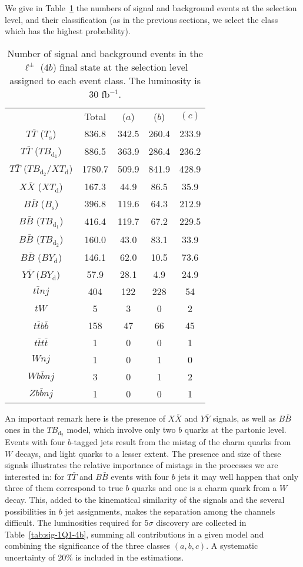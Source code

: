 \documentclass[12pt,a4paper]{article}
\newcommand{\TT}{T \bar T}
\newcommand{\BB}{B \bar B}
\newcommand{\XX}{X \bar X}
\newcommand{\YY}{Y \bar Y}
\newcommand{\Ts}{T_\text{s}}
\newcommand{\Bs}{B_\text{s}}
\newcommand{\TBd}{TB_{\text{d}_1}}
\newcommand{\TBD}{TB_{\text{d}_2}}
\newcommand{\XTd}{XT_\text{d}}
\newcommand{\BYd}{BY_\text{d}}
\begin{document}
We give in Table~\ref{tab:nsnb-1Q1-4b} the numbers of signal and background events at the selection level, and their classification (as in the previous sections, we select the class which has the highest probability).
%
\begin{table}[htb]
\begin{center}
\begin{tabular}{ccccc}
               & Total  & ($a$) & ($b$) & $(c)$ \\[1mm]
$\TT$ ($\Ts$)  & 836.8  & 342.5 & 260.4 & 233.9 \\
$\TT$ ($\TBd$) & 886.5  & 363.9 & 286.4 & 236.2 \\
$\TT$ ($\TBD$/$\XTd$) & 1780.7 & 509.9 & 841.9 & 428.9 \\
$\XX$ ($\XTd$) & 167.3  & 44.9  & 86.5  & 35.9  \\
$\BB$ ($\Bs$)  & 396.8 & 119.6 & 64.3 & 212.9 \\
$\BB$ ($\TBd$) & 416.4 & 119.7 & 67.2 & 229.5 \\
$\BB$ ($\TBD$) & 160.0 & 43.0  & 83.1 & 33.9 \\
$\BB$ ($\BYd$) & 146.1 & 62.0  & 10.5 & 73.6 \\
$\YY$ ($\BYd$) & 57.9  & 28.1  & 4.9  & 24.9 \\
\hline
$t \bar tnj$   & 404    & 122   & 228   & 54 \\
$tW$           & 5      & 3     & 0     & 2 \\
$t\bar tb\bar b$& 158   & 47    & 66    & 45 \\
$t\bar tt\bar t$& 1     & 0     & 0     & 1 \\
$Wnj$          & 1     & 0     & 1    & 0 \\
$Wb \bar b nj$ & 3     & 0     & 1    & 2 \\
$Zb \bar b nj$ & 1     & 0     & 0    & 1
\end{tabular}
\end{center}
\caption{Number of signal and background events in the $\ell^\pm$ ($4b$) final state at the selection level assigned to each event class. The luminosity is 30 fb$^{-1}$.}
\label{tab:nsnb-1Q1-4b}
\end{table}
%
An important remark here is the presence of $\XX$ and $\YY$ signals, as well as $\BB$ ones in the $\TBD$ model, which involve only two $b$ quarks at the partonic level. Events with four $b$-tagged jets result from the mistag of the charm quarks from $W$ decays, and light quarks to a lesser extent. The presence and size of these signals illustrates the relative importance of mistags in the processes we are interested in: for $\TT$ and $\BB$ events with four $b$ jets it may well happen that only three of them correspond to true $b$ quarks and one is a charm quark from a $W$ decay. This, added to the kinematical similarity of the signals and the several possibilities in $b$ jet assignments, makes the separation among the channels difficult.
The luminosities required for $5\sigma$ discovery are collected in Table~\ref{tab:sig-1Q1-4b}, summing all contributions in a given model and combining the significance of the three classes $(a,b,c)$. A systematic uncertainty of 20\% is included in the estimations.
\end{document}
